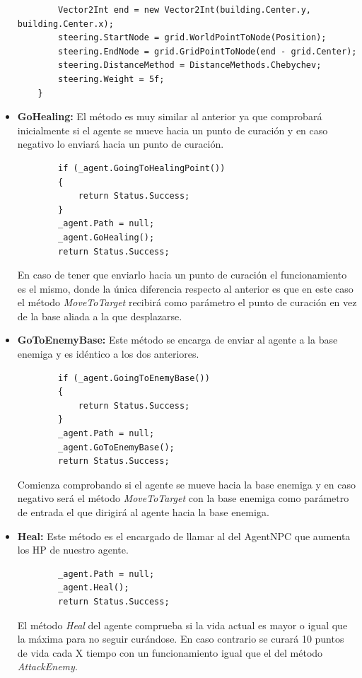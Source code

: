 \begin{itemize}
\begin{lstlisting}
        Vector2Int end = new Vector2Int(building.Center.y, building.Center.x);
        steering.StartNode = grid.WorldPointToNode(Position);
        steering.EndNode = grid.GridPointToNode(end - grid.Center);
        steering.DistanceMethod = DistanceMethods.Chebychev;
        steering.Weight = 5f;
    }
    \end{lstlisting}
    
    \item \textbf{GoHealing: } El método es muy similar al anterior ya que comprobará inicialmente si el agente se mueve hacia un punto de curación y en caso negativo lo enviará hacia un punto de curación.
    \begin{lstlisting}
        if (_agent.GoingToHealingPoint())
        {
            return Status.Success;
        }
        _agent.Path = null;
        _agent.GoHealing();
        return Status.Success;
    \end{lstlisting}
    En caso de tener que enviarlo hacia un punto de curación el funcionamiento es el mismo, donde la única diferencia respecto al anterior es que en este caso el método \textit{MoveToTarget} recibirá como parámetro el punto de curación en vez de la base aliada a la que desplazarse.
    \item \textbf{GoToEnemyBase: }Este método se encarga de enviar al agente a la base enemiga y es idéntico a los dos anteriores. 
    \begin{lstlisting}
        if (_agent.GoingToEnemyBase())
        {
            return Status.Success;
        }
        _agent.Path = null;
        _agent.GoToEnemyBase();
        return Status.Success;
    \end{lstlisting}
    Comienza comprobando si el agente se mueve hacia la base enemiga y en caso negativo será el método \textit{MoveToTarget} con la base enemiga como parámetro de entrada el que dirigirá al agente hacia la base enemiga.
    \item \textbf{Heal: } Este método es el encargado de llamar al del AgentNPC que aumenta los HP de nuestro agente.
    \begin{lstlisting}
        _agent.Path = null;
        _agent.Heal();
        return Status.Success;
    \end{lstlisting}
    El método \textit{Heal} del agente comprueba si la vida actual es mayor o igual que la máxima para no seguir curándose. En caso contrario se curará 10 puntos de vida cada X tiempo con un funcionamiento igual que el del método \textit{AttackEnemy}.
\end{itemize}



